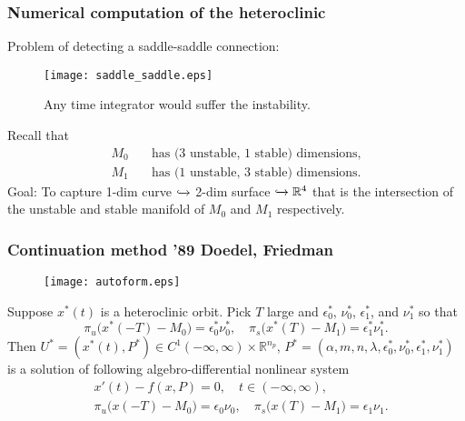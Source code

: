 \documentclass{beamer}
\def\red{\color{red}}
\begin{document}
\begin{frame}
 \frametitle{Numerical computation of the heteroclinic}%
 Problem of detecting a {\red saddle-saddle} connection:
 \begin{figure}
  \texttt{[image: saddle\_saddle.eps]}
  \caption{\scriptsize Any time integrator would suffer the instability.}
 \end{figure}
 {\scriptsize
 Recall that
 \begin{align*}
 M_0 \quad &\text{has (3 unstable, 1 stable) dimensions},\\             
 M_1 \quad &\text{has (1 unstable, 3 stable) dimensions.}
 \end{align*}
 }
 Goal: To capture {\red 1-dim curve} $\xhookrightarrow{}$ 2-dim surface $\xhookrightarrow{}\mathbb{R}^4$ that is the intersection of the unstable and stable manifold of $M_0$ and $M_1$ respectively.
 
\end{frame}

\begin{frame}
 \frametitle{Continuation method '89 Doedel, Friedman}
 \begin{figure}
  \texttt{[image: autoform.eps]}
 \end{figure}
 {\scriptsize
 Suppose $x^*(t)$ is a heteroclinic orbit. Pick $T$ large and $\epsilon_0^*$, $\nu_0^*$, $\epsilon_1^*$, and $\nu_1^*$ so that
 $$\pi_u\big(x^*(-T)-M_0\big) = \epsilon_0^*\nu_0^*, \quad\pi_s\big(x^*(T)-M_1\big) = \epsilon_1^*\nu_1^*.$$
 Then $U^*= (x^*(t),P^*) \in C^1(-\infty,\infty) \times \mathbb{R}^{n_p}$, $P^*=(\alpha,m,n,\lambda, \epsilon_0^*,\nu_0^*,\epsilon_1^*,\nu_1^*)$ is a solution of following algebro-differential nonlinear system
 \begin{align*}
  &x'(t) - f(x,P) =0, \quad t\in (-\infty,\infty),\\
  &\pi_u\big(x(-T)-M_0\big) = \epsilon_0\nu_0, \quad\pi_s\big(x(T)-M_1\big) = \epsilon_1\nu_1.
 \end{align*}
 }
\end{frame}
\end{document}
